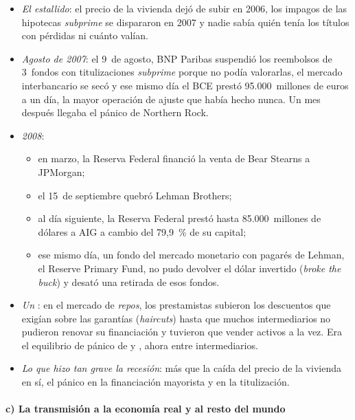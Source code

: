 \documentclass[11pt]{article}
\begin{document}
\begin{itemize}
\item \emph{El estallido}: el precio de la vivienda dejó de subir en 2006, los impagos de las hipotecas \emph{subprime} se dispararon en 2007 y nadie sabía quién tenía los títulos con pérdidas ni cuánto valían.
\item \emph{Agosto de 2007}: el 9~de agosto, BNP Paribas suspendió los reembolsos de 3~fondos con titulizaciones \emph{subprime} porque no podía valorarlas, el mercado interbancario se secó y ese mismo día el BCE prestó 95.000~millones de euros a un día, la mayor operación de ajuste que había hecho nunca\nocite{FRBSL2026Cronologia,BCE2008InformeAnual2007}. Un mes después llegaba el pánico de Northern Rock\nocite{ShinNorthernRock2009}.
\item \emph{2008}:
  \begin{itemize}
  \item en marzo, la Reserva Federal financió la venta de Bear Stearns a JPMorgan\nocite{FRBSL2026Cronologia};
  \item el 15~de septiembre quebró Lehman Brothers\nocite{FRBSL2026Cronologia};
  \item al día siguiente, la Reserva Federal prestó hasta 85.000~millones de dólares a AIG a cambio del 79,9~\% de su capital\nocite{Fed2008AIG};
  \item ese mismo día, un fondo del mercado monetario con pagarés de Lehman, el Reserve Primary Fund, no pudo devolver el dólar invertido (\emph{broke the buck}) y desató una retirada de esos fondos\nocite{FRBSL2026Cronologia,FCIC2011Report}.
  \end{itemize}
\item \emph{Un }: en el mercado de \emph{repos}, los prestamistas subieron los descuentos que exigían sobre las garantías (\emph{haircuts}) hasta que muchos intermediarios no pudieron renovar su financiación y tuvieron que vender activos a la vez\nocite{GortonMetrick2012Securitized}. Era el equilibrio de pánico de  y , ahora entre intermediarios.
\item \emph{Lo que hizo tan grave la recesión}: más que la caída del precio de la vivienda en sí, el pánico en la financiación mayorista y en la titulización\nocite{Bernanke2018Real}.
\end{itemize}

\paragraph{c) La transmisión a la economía real y al resto del mundo}
\end{document}
